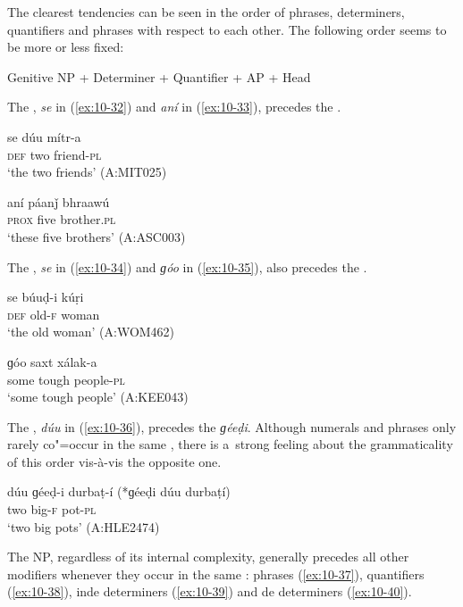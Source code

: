 The clearest tendencies can be seen in the order of  phrases, determiners, quantifiers and  phrases with respect to each other. The following order seems to be more or less fixed:


Genitive NP + Determiner + Quantifier + AP + Head


The , \textit{se} in (\ref{ex:10-32}) and \textit{aní} in (\ref{ex:10-33}), precedes the .

\begin{exe}
\ex
\label{ex:10-32}
\gll se dúu mítr-a \\
\textsc{def} two friend-\textsc{pl} \\
\glt `the two friends' (A:MIT025)

\ex
\label{ex:10-33}
\gll aní páanǰ bhraawú \\
\textsc{prox} five brother.\textsc{pl}  \\
\glt `these five brothers' (A:ASC003)
\end{exe}

The , \textit{se} in (\ref{ex:10-34}) and \textit{ɡóo} in (\ref{ex:10-35}), also precedes the  .

\begin{exe}
\ex
\label{ex:10-34}
\gll se búuḍ-i kúṛi \\
\textsc{def} old-\textsc{f} woman \\
\glt `the old woman' (A:WOM462)

\ex
\label{ex:10-35}
\gll ɡóo saxt xálak-a \\
some tough people-\textsc{pl}  \\
\glt `some tough people' (A:KEE043)
\end{exe}


The , \textit{dúu} in (\ref{ex:10-36}), precedes the   \textit{ɡéeḍi}. Although numerals and  phrases only rarely co"=occur in the same  , there is a~strong feeling about the grammaticality of this order vis-à-vis the opposite one.

\begin{exe}
\ex
\label{ex:10-36}
\gll dúu ɡéeḍ-i durbaṭ-í (*ɡéeḍi dúu durbaṭí) \\
two big-\textsc{f} pot-\textsc{pl} \\
\glt `two big pots' (A:HLE2474)
\end{exe}


The  NP, regardless of its internal complexity, generally precedes all other modifiers
whenever they occur in the same  :  phrases (\ref{ex:10-37}), quantifiers
(\ref{ex:10-38}), inde determiners (\ref{ex:10-39}) and de determiners
(\ref{ex:10-40}).

